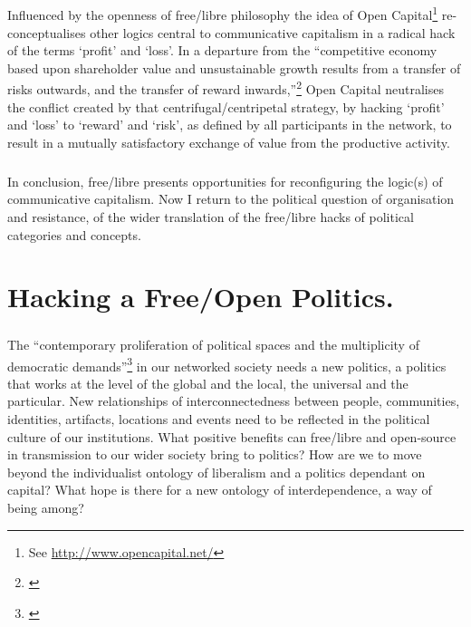 \documentclass[11pt,titlepage]{book}
\begin{document}
\paragraph{}Influenced by the openness of free/libre philosophy the idea of Open Capital\footnote{See \url{http://www.opencapital.net/}} re-conceptualises other logics central to communicative capitalism in a radical hack of the terms `profit' and `loss'. In a departure from the ``competitive economy based upon shareholder value and unsustainable growth results from a transfer of risks outwards, and the transfer of reward inwards,''\footnote{\cite[p. 17]{cook:2004cp}} Open Capital neutralises the conflict created by that centrifugal/centripetal strategy, by hacking `profit' and `loss' to `reward' and `risk', as defined by all participants in the network, to result in a mutually satisfactory exchange of value from the productive activity.

\paragraph{}In conclusion, free/libre presents opportunities for reconfiguring the logic(s) of communicative capitalism. Now I return to the political question of organisation and resistance, of the wider translation of the free/libre hacks of political categories and concepts.
\newpage
\chapter{Hacking a Free/Open Politics.}
\paragraph{}The ``contemporary proliferation of political spaces and the multiplicity of democratic demands''\footnote{\cite[p.17]{Mouffe:2000fk}} in our networked society needs a new politics, a politics that works at the level of the global and the local, the universal and the particular. New relationships of interconnectedness between people, communities, identities, artifacts, locations and events need to be reflected in the political culture of our institutions. What positive benefits can free/libre and open-source in transmission to our wider society bring to politics? How are we to move beyond the individualist ontology of liberalism and a politics dependant on capital? What hope is there for a new ontology of interdependence, a way of being among?
\end{document}
